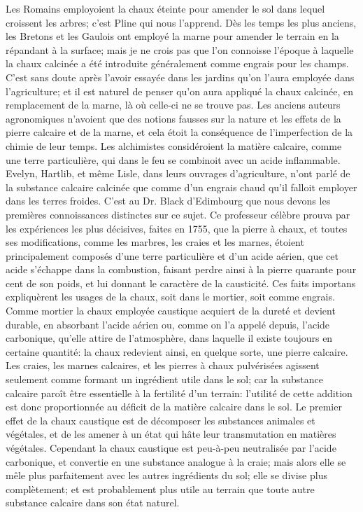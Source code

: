 Les Romains employoient la chaux éteinte\setcounter{page}{348} pour amender le sol dans lequel croissent les arbres; c'est Pline qui nous l'apprend. Dès les temps les plus anciens, les Bretons et les Gaulois ont employé la marne pour amender le terrain en la répandant à la surface; mais je ne crois pas que l'on connoisse l'époque à laquelle la chaux calcinée a été introduite généralement comme engrais pour les champs. C'est sans doute après l'avoir essayée dans les jardins qu'on l'aura employée dans l'agriculture; et il est naturel de penser qu'on aura appliqué la chaux calcinée, en remplacement de la marne, là où celle-ci ne se trouve pas.
Les anciens auteurs agronomiques n'avoient que des notions fausses sur la nature et les effets de la pierre calcaire et de la marne, et cela étoit la conséquence de l'imperfection de la chimie de leur temps. Les alchimistes considéroient la matière calcaire, comme une terre particulière, qui dans le feu se combinoit avec un acide inflammable. Evelyn, Hartlib, et même Lisle, dans leurs ouvrages d'agriculture, n'ont parlé de la substance calcaire calcinée que comme d'un engrais chaud qu'il falloit employer dans les terres froides. C'est au Dr. Black d'Edimbourg que nous devons les premières connoissances distinctes sur ce sujet. Ce professeur célèbre prouva par les expériences les\setcounter{page}{349} plus décisives, faites en 1755, que la pierre à chaux, et toutes ses modifications, comme les marbres, les craies et les marnes, étoient principalement composés d'une terre particulière et d'un acide aérien, que cet acide s'échappe dans la combustion, faisant perdre ainsi à la pierre quarante pour cent de son poids, et lui donnant le caractère de la causticité.
Ces faits importans expliquèrent les usages de la chaux, soit dans le mortier, soit comme engrais. Comme mortier la chaux employée caustique acquiert de la dureté et devient durable, en absorbant l'acide aérien ou, comme on l'a appelé depuis, l'acide carbonique, qu'elle attire de l'atmosphère, dans laquelle il existe toujours en certaine quantité: la chaux redevient ainsi, en quelque sorte, une pierre calcaire.
Les craies, les marnes calcaires, et les pierres à chaux pulvérisées agissent seulement comme formant un ingrédient utile dans le sol; car la substance calcaire paroît être essentielle à la fertilité d'un terrain: l'utilité de cette addition est donc proportionnée au déficit de la matière calcaire dans le sol.
Le premier effet de la chaux caustique est de décomposer les substances animales et végétales, et de les amener à un état qui\setcounter{page}{350} hâte leur transmutation en matières végétales. Cependant la chaux caustique est peu-à-peu neutralisée par l'acide carbonique, et convertie en une substance analogue à la craie; mais alors elle se mêle plus parfaitement avec les autres ingrédients du sol; elle se divise plus complètement; et est probablement plus utile au terrain que toute autre substance calcaire dans son état naturel.

